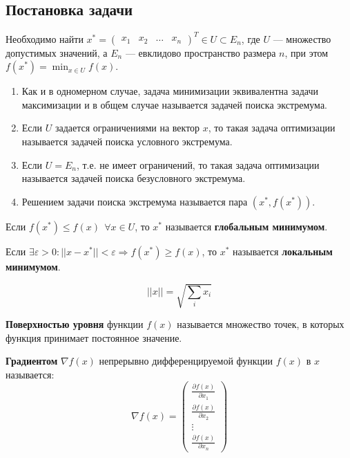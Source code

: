 \subsection{Постановка задачи}

Необходимо найти \(x^* = \begin{pmatrix} x_1 & x_2 & \dots & x_n \end{pmatrix}^T \in U \subset E_n\), где \(U\) --- множество допустимых значений, а \(E_n\) --- евклидово пространство размера \(n\), при этом \(f(x^*) = \min_{x\in U} f(x)\).

\begin{remark}\itemfix
    \begin{enumerate}
        \item Как и в одномерном случае, задача минимизации эквивалентна задачи максимизации и в общем случае называется задачей поиска экстремума.
        \item Если \(U\) задается ограничениями на вектор \(x\), то такая задача оптимизации называется задачей поиска условного экстремума.
        \item Если \(U = E_n\), т.е. не имеет ограничений, то такая задача оптимизации называется задачей поиска безусловного экстремума.
        \item Решением задачи поиска экстремума называется пара \((x^*, f(x^*))\).
    \end{enumerate}
\end{remark}

\begin{definition}
    Если \(f(x^*) \leq f(x) \ \ \forall x\in U\), то \(x^*\) называется \textbf{глобальным минимумом}.
\end{definition}
\begin{definition}
    Если \(\exists \varepsilon > 0 : ||x - x^*|| < \varepsilon \Rightarrow f(x^*) \geq f(x)\), то \(x^*\) называется \textbf{локальным минимумом}.
\end{definition}
\begin{remark}
    \[||x|| = \sqrt{\sum_i x_i}\]
\end{remark}

\begin{definition}
    \textbf{Поверхностью уровня} функции \(f(x)\) называется множество точек, в которых функция принимает постоянное значение.
\end{definition}

\begin{definition}
    \textbf{Градиентом} \(\nabla f(x)\) непрерывно дифференцируемой функции \(f(x)\) в \(x\) называется:
    \[\nabla f(x) = \begin{pmatrix} \frac{\partial f(x)}{\partial x_1} \\ \frac{\partial f(x)}{\partial x_2} \\ \vdots \\ \frac{\partial f(x)}{\partial x_n} \end{pmatrix} \]
\end{definition}

